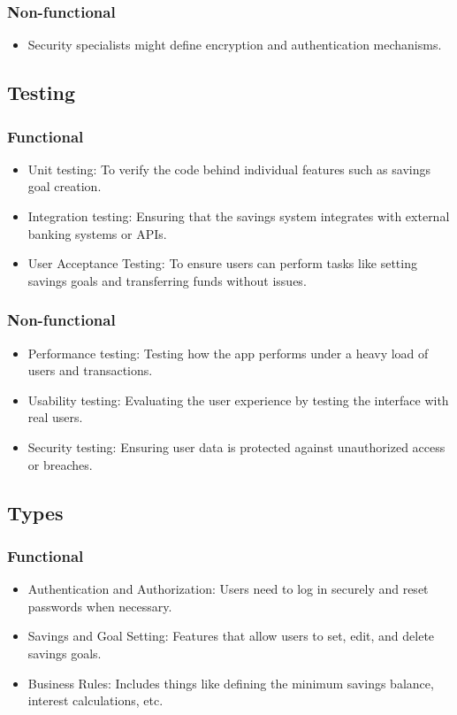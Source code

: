 \documentclass{article}
\begin{document}
\subsubsection{Non-functional}
\begin{itemize}
    \item Security specialists might define encryption and authentication mechanisms.
\end{itemize}

\subsection{Testing}
\subsubsection{Functional}
\begin{itemize}
    \item Unit testing: To verify the code behind individual features such as savings goal creation.
    \item Integration testing: Ensuring that the savings system integrates with external banking systems or APIs.
    \item User Acceptance Testing: To ensure users can perform tasks like setting savings goals and transferring funds without issues.
\end{itemize}
\subsubsection{Non-functional}
\begin{itemize}
    \item Performance testing: Testing how the app performs under a heavy load of users and transactions.
    \item Usability testing: Evaluating the user experience by testing the interface with real users.
    \item Security testing: Ensuring user data is protected against unauthorized access or breaches.
\end{itemize}

\subsection{Types}
\subsubsection{Functional}
\begin{itemize}
    \item Authentication and Authorization: Users need to log in securely and reset passwords when necessary.
    \item Savings and Goal Setting: Features that allow users to set, edit, and delete savings goals.
    \item Business Rules: Includes things like defining the minimum savings balance, interest calculations, etc.
\end{itemize}
\end{document}
